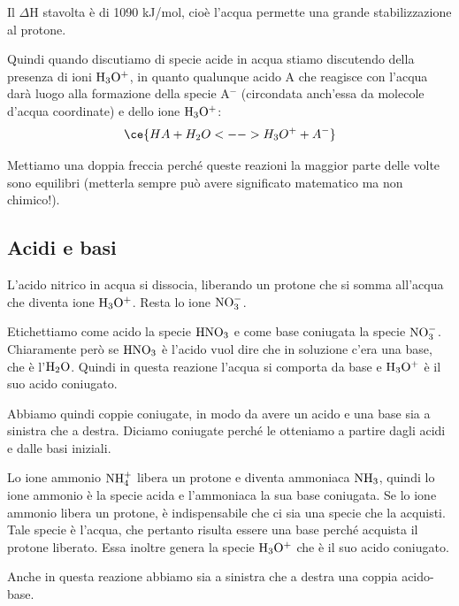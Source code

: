 Il $\Delta$H stavolta è di 1090 kJ/mol, cioè l'acqua permette una grande stabilizzazione al protone.

\vspace{0.2cm}Quindi quando discutiamo di specie acide in acqua stiamo discutendo della presenza di ioni $\rm H_3O^+$, in quanto qualunque acido A che reagisce con l'acqua darà luogo alla formazione della specie A$^-$ (circondata anch'essa da molecole d'acqua coordinate) e dello ione $\rm H_3O^+$:
$$\ce{HA + H_2O <--> H_3O^+ + A^-}$$

Mettiamo una doppia freccia perché queste reazioni la maggior parte delle volte sono equilibri (metterla sempre può avere significato matematico ma non chimico!).
\subsection{Acidi e basi}

\vspace{0.2cm}

\vspace{0.2cm}L'acido nitrico in acqua si dissocia, liberando un protone che si somma all'acqua che diventa ione $\rm H_3O^+$. Resta lo ione $\rm NO_3^-$.

Etichettiamo come acido la specie $\rm HNO_3$ e come base coniugata la specie $\rm NO_3^-$. Chiaramente però se $\rm HNO_3$ è l'acido vuol dire che in soluzione c'era una base, che è l'$\rm H_2O$. Quindi in questa reazione l'acqua si comporta da base e $\rm H_3O^+$ è il suo acido coniugato.

Abbiamo quindi coppie coniugate, in modo da avere un acido e una base sia a sinistra che a destra. Diciamo coniugate perché le otteniamo a partire dagli acidi e dalle basi iniziali.

\vspace{0.2cm}

\vspace{0.2cm}Lo ione ammonio $\rm NH_4^+$ libera un protone e diventa ammoniaca $\rm NH_3$, quindi lo ione ammonio è la specie acida e l'ammoniaca la sua base coniugata. Se lo ione ammonio libera un protone, è indispensabile che ci sia una specie che la acquisti. Tale specie è l'acqua, che pertanto risulta essere una base perché acquista il protone liberato. Essa inoltre genera la specie $\rm H_3O^+$ che è il suo acido coniugato.

Anche in questa reazione abbiamo sia a sinistra che a destra una coppia acido-base.

